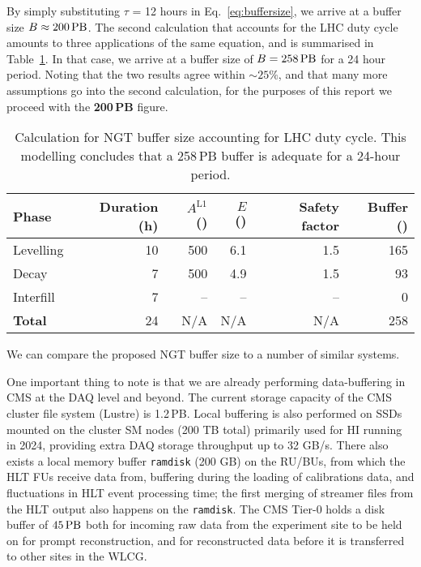 By simply substituting $\tau$ = 12 hours in Eq.~\ref{eq:buffersize}, we arrive at a buffer size $B \approx 200\,\text{PB}$.
The second calculation that accounts for the LHC duty cycle amounts to three applications of the same equation,
and is summarised in Table~\ref{tab:bufferWithDutyCycle}. In that case, we arrive at a buffer size of $B = 258\,\text{PB}$ for a 24 hour period.
Noting that the two results agree within $\sim25\%$, and that many more assumptions go into the second calculation, for the purposes of this report we proceed with the \textbf{200\,PB} figure.
\begin{table}[htbp]
   \centering
   \begin{tabular}{@{} lrrrrr @{}} %
      \toprule
		Phase & Duration (h) & $A^{\text{L1}}$ (\kHz) & $E$ (\MB) & Safety factor & Buffer (\PB)\\
      	\midrule
		Levelling & 10 & 500 & 6.1 & 1.5 & 165 \\
		Decay     &  7 & 500 & 4.9 & 1.5 &  93 \\
		Interfill &  7 &  -- &  -- &  -- &   0 \\
		\midrule
\textbf{Total}    & 24 & N/A & N/A & N/A & 258\\ 
      \bottomrule
   \end{tabular}
   \caption{Calculation for NGT buffer size accounting for LHC duty cycle. 
   This modelling concludes that a 258\,PB buffer is adequate for a 24-hour period.}
   \label{tab:bufferWithDutyCycle}
\end{table}

We can compare the proposed NGT buffer size to a number of similar systems. 

One important thing to note is that we are already performing data-buffering in CMS at the DAQ level and beyond. The current storage capacity of the CMS \Runthree cluster file system (Lustre) is 1.2\,PB. Local buffering is also performed on SSDs mounted on the cluster SM nodes (200 TB total) primarily used for HI running in 2024, providing extra DAQ storage throughput up to 32 GB/s. There also exists a local memory buffer \texttt{ramdisk} (200 GB) on the RU/BUs, from which the HLT FUs receive data from, buffering during the loading of calibrations data, and fluctuations in HLT event processing time; the first merging of streamer files from the HLT output also happens on the \texttt{ramdisk}. The CMS Tier-0 holds a disk buffer of $45\,\text{PB}$ both 
for incoming raw data from the experiment site to be held on for prompt reconstruction, and
for reconstructed data before it is transferred to other sites in the WLCG.

